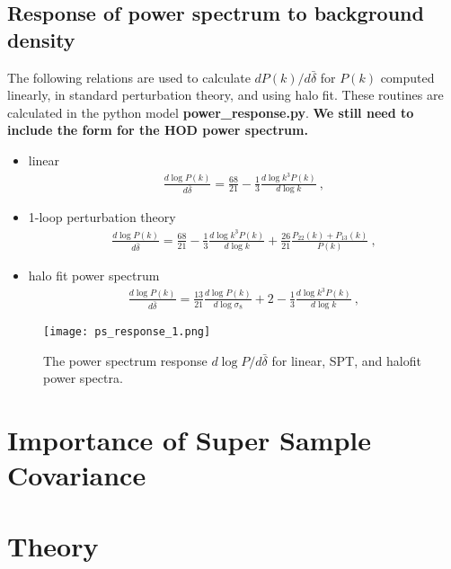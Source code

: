 \documentclass[11pt, oneside]{article}   	%
\begin{document}
\subsection{Response of power spectrum to background density} 
The following relations are used to calculate $ d P(k)/d\bar{\delta}$ for $P(k)$ computed linearly, in standard perturbation theory, and using halo fit. These routines are calculated in the python model \textbf{power\_response.py}. \textbf{We still need to include the form for the HOD power spectrum.} 
\begin{itemize} 
\item{linear 
\begin{align} 
\frac{ d \log P(k)}{d \bar{\delta}}=\frac{68}{21} - \frac{1}{3} \frac{ d \log k^3 P(k)}{d \log k}~, 
\end{align} 
} 
\item{1-loop perturbation theory
\begin{align} 
\frac{ d \log P(k)}{d \bar{\delta}}=\frac{68}{21} - \frac{1}{3} \frac{ d \log k^3 P(k)}{d \log k} + \frac{26}{21} \frac{P_{22}(k) + P_{13}(k)}{P(k)} ~, 
\end{align} 
} 
\item{halo fit power spectrum
\begin{align} 
\frac{ d \log P(k)}{d \bar{\delta}}= \frac{13}{21} \frac{ d \log P(k)}{d \log \sigma_8} + 2 - \frac{1}{3} \frac{ d \log k^3 P(k)}{d \log k}~, 
\end{align} 
}
\end{itemize} 

 \begin{figure}[!ht]
 \centering
\texttt{[image: ps\_response\_1.png]}
  \caption{The power spectrum response $d \log P/d\bar{\delta}$ for linear, SPT, and halofit power spectra.}
\label{fig:field}
\end{figure}

\section{Importance of Super Sample Covariance} 


\section{Theory}


 






 
\end{document}
